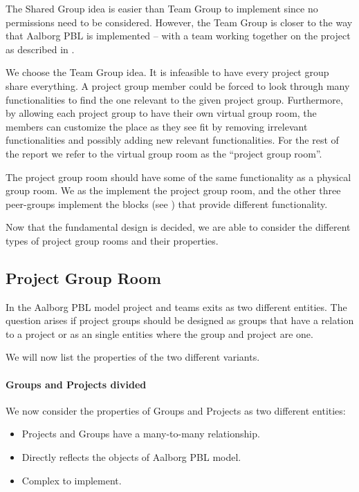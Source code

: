 The Shared Group idea is easier than Team Group to implement since no permissions need to be considered.
However, the Team Group is closer to the way that Aalborg PBL is implemented -- with a team working together on the project as described in .

We choose the Team Group idea. 
It is infeasible to have every project group share everything.
A project group member could be forced to look through many functionalities to find the one relevant to the given project group.
Furthermore, by allowing each project group to have their own virtual group room, the members can customize the place as they see fit by removing irrelevant functionalities and possibly adding new relevant functionalities.
For the rest of the report we refer to the virtual group room as the ``project group room''.

The project group room should have some of the same functionality as a physical group room.
We as the \groupname{} implement the project group room, and the other three peer-groups implement the blocks (see ) that provide different functionality.

Now that the fundamental design is decided, we are able to consider the different types of project group rooms and their properties.


\subsection{Project Group Room}
In the Aalborg PBL model project and teams exits as two different entities. 
The question arises if project groups should be designed as groups that have a relation to a project or as an single entities where the group and project are one. 

We will now list the properties of the two different variants. 

\paragraph{Groups and Projects divided} We now consider the properties of Groups and Projects as two different entities:
\begin{itemize}
	\item Projects and Groups have a many-to-many relationship.
	\item Directly reflects the objects of Aalborg PBL model.
	\item Complex to implement.
\end{itemize}


